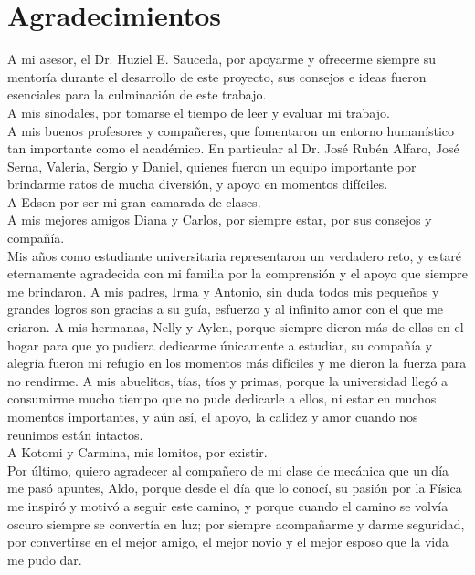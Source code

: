 
\bigskip

\begingroup
\let\clearpage\relax
\let\cleardoublepage\relax
\let\cleardoublepage\relax
\chapter*{Agradecimientos}

A mi asesor, el Dr. Huziel E. Sauceda, por apoyarme y ofrecerme siempre su mentoría durante el desarrollo de este proyecto, sus consejos e ideas fueron esenciales para la culminación de este trabajo.
\\
A mis sinodales, por tomarse el tiempo de leer y evaluar mi trabajo.
\\

A mis buenos profesores y compañeres, que fomentaron un entorno humanístico tan importante como el académico. En particular al Dr. José Rubén Alfaro, José Serna, Valeria, Sergio y Daniel, quienes fueron un equipo importante por brindarme ratos de mucha diversión, y apoyo en momentos difíciles.\\
A Edson por ser mi gran camarada de clases.
\\
A mis mejores amigos Diana y Carlos, por siempre estar, por sus consejos y compañía.
\\

Mis años como estudiante universitaria representaron un verdadero reto, y estaré eternamente agradecida con mi familia por la comprensión y el apoyo que siempre me brindaron. A mis padres, Irma y Antonio, sin duda todos mis pequeños y grandes logros son gracias a su guía, esfuerzo y al infinito amor con el que me criaron. A mis hermanas, Nelly y Aylen, porque siempre dieron más de ellas en el hogar para que yo pudiera dedicarme únicamente a estudiar, su compañía y alegría fueron mi refugio en los momentos más difíciles y me dieron la fuerza para no rendirme. A mis abuelitos, tías, tíos y primas, porque la universidad llegó a consumirme mucho tiempo que no pude dedicarle a ellos, ni estar en muchos momentos importantes, y aún así, el apoyo, la calidez y amor cuando nos reunimos están intactos.\\
A Kotomi y Carmina, mis lomitos, por existir.
\\
Por último, quiero agradecer al compañero de mi clase de mecánica que un día me pasó apuntes, Aldo, porque desde el día que lo conocí, su pasión por la Física me inspiró y motivó a seguir este camino, y porque cuando el camino se volvía oscuro siempre se convertía en luz; por siempre acompañarme y darme seguridad, por convertirse en el mejor amigo, el mejor novio y el mejor esposo que la vida me pudo dar.
\endgroup
